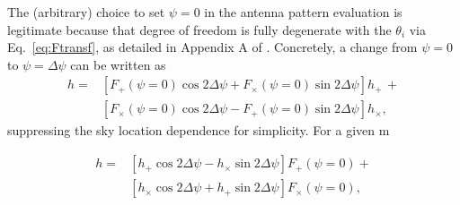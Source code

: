 \documentclass[aps,prd,twocolumn,superscriptaddress,preprintnumbers,floatfix,nofootinbib]{revtex4-2}
\begin{document}
The (arbitrary) choice to set $\psi=0$ in the antenna pattern evaluation is legitimate because that degree of freedom is fully degenerate with the $\theta_i$ via Eq.~\eqref{eq:Ftransf}, as detailed in Appendix A of \cite{Isi:2017equ}.
Concretely, a change from $\psi = 0$ to $\psi= \Delta\psi$ can be written as
\begin{align}
h = &\left[ F_+(\psi=0) \cos 2\Delta\psi + F_\times(\psi=0) \sin 2\Delta\psi \right] h_+\, +\nonumber\\
&\left[F_\times(\psi=0) \cos 2\Delta\psi - F_+(\psi=0)\sin 2\Delta\psi\right] h_\times, 
\end{align}
suppressing the sky location dependence for simplicity.
For a given m

\begin{align}
h = & \left[h_+ \cos 2\Delta\psi - h_\times \sin 2\Delta\psi \right] F_+(\psi=0) +\nonumber\\
&\left[h_\times \cos 2\Delta\psi + h_+ \sin 2\Delta\psi\right] F_\times(\psi=0), 
\end{align}

\end{document}
